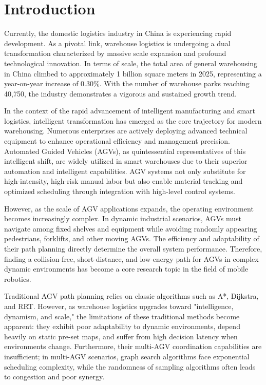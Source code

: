 \section{Introduction}\label{sec1}

Currently, the domestic logistics industry in China is experiencing rapid development. As a pivotal link, warehouse logistics is undergoing a dual transformation characterized by massive scale expansion and profound technological innovation. In terms of scale, the total area of general warehousing in China climbed to approximately 1 billion square meters in 2025, representing a year-on-year increase of 0.30\%. With the number of warehouse parks reaching 40,750, the industry demonstrates a vigorous and sustained growth trend.

In the context of the rapid advancement of intelligent manufacturing and smart logistics, intelligent transformation has emerged as the core trajectory for modern warehousing. Numerous enterprises are actively deploying advanced technical equipment to enhance operational efficiency and management precision. Automated Guided Vehicles (AGVs), as quintessential representatives of this intelligent shift, are widely utilized in smart warehouses due to their superior automation and intelligent capabilities. AGV systems not only substitute for high-intensity, high-risk manual labor but also enable material tracking and optimized scheduling through integration with high-level control systems. 

However, as the scale of AGV applications expands, the operating environment becomes increasingly complex. In dynamic industrial scenarios, AGVs must navigate among fixed shelves and equipment while avoiding randomly appearing pedestrians, forklifts, and other moving AGVs. The efficiency and adaptability of their path planning directly determine the overall system performance. Therefore, finding a collision-free, short-distance, and low-energy path for AGVs in complex dynamic environments has become a core research topic in the field of mobile robotics.

Traditional AGV path planning relies on classic algorithms such as A*, Dijkstra, and RRT. However, as warehouse logistics upgrades toward "intelligence, dynamism, and scale," the limitations of these traditional methods become apparent: they exhibit poor adaptability to dynamic environments, depend heavily on static pre-set maps, and suffer from high decision latency when environments change. Furthermore, their multi-AGV coordination capabilities are insufficient; in multi-AGV scenarios, graph search algorithms face exponential scheduling complexity, while the randomness of sampling algorithms often leads to congestion and poor synergy.

